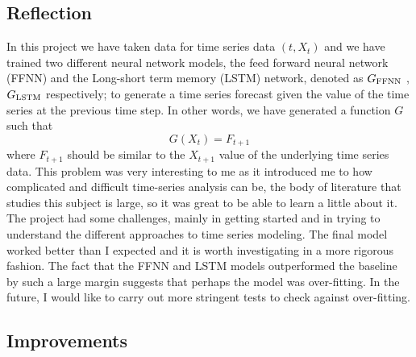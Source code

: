 \documentclass[10pt,a4paper]{article}
\begin{document}
\subsection{Reflection}
%
In this project we have taken data for time series data $(t,X_t)$ and we have trained two different neural network models, the feed forward neural network (FFNN) and the Long-short term memory (LSTM) network, denoted as $G_{\rm FFNN}$ ,$G_{\rm LSTM}$ respectively; to generate a time series forecast given the value of the time series at the previous time step. In other words, we have generated a function $G$ such that
\begin{equation}
G(X_{t}) = F_{t+1}
\end{equation}
where $F_{t+1}$ should be similar to the $X_{t+1}$ value of the underlying time series data. This problem was very interesting to me as it introduced me to how complicated and difficult time-series analysis can be, the body of literature that studies this subject is large, so it was great to be able to learn a little about it. The project had some challenges, mainly in getting started and in trying to understand the different approaches to time series modeling. The final model worked better than I expected and it is worth investigating in a more rigorous fashion. The fact that the FFNN and LSTM models outperformed the baseline by such a large margin suggests that perhaps the model was over-fitting. In the future, I would like to carry out more stringent tests to check against over-fitting.
 

\subsection{Improvements}
%
\end{document}
